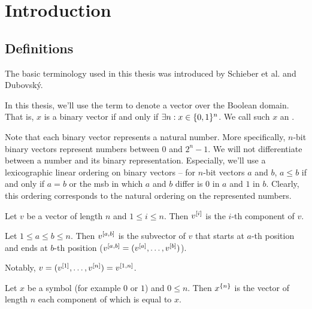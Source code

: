 \chapter{Introduction}

\section{Definitions}

The basic terminology used in this thesis
was introduced by Schieber et al.\cite{Schieber2005154}
and Dubovský.\cite{Dubovsky2012}

\begin{definition}
In this thesis,
we'll use the term 
to denote a vector over the Boolean domain.
That is, $x$ is a binary vector if and only if
$\exists n : x \in \{0, 1\}^n$.
We call such $x$ an .
\end{definition}

Note that each binary vector represents a natural number.
More specifically,
$n$-bit binary vectors represent numbers
between $0$ and $2^n - 1$.
We will not differentiate between a number
and its binary representation.
Especially,
we'll use a lexicographic linear ordering
on binary vectors --
for $n$-bit vectors $a$ and $b$,
$a \leq b$ if and only if $a = b$ or
the \acrlong{msb}
in which $a$ and $b$ differ
is $0$ in $a$ and $1$ in $b$.
Clearly,
this ordering corresponds to the natural ordering
on the represented numbers.

\begin{definition}
Let $v$ be a vector of length $n$ and $1 \leq i \leq n$.
Then $v^{[i]}$ is the $i$-th component of $v$.

Let $1 \leq a \leq b \leq n$.
Then $v^{[a, b]}$ is the subvector of $v$
that starts at $a$-th position
and ends at $b$-th position
($v^{[a, b]} = (v^{[a]}, \ldots, v^{[b]})$).
\end{definition}

Notably,
$v = (v^{[1]}, \ldots, v^{[n]}) = v^{[1, n]}$.

\begin{definition}
Let $x$ be a symbol (for example $0$ or $1$)
and $0 \leq n$.
Then $x^{\{n\}}$ is the vector of length $n$
each component of which is equal to $x$.
\end{definition}

